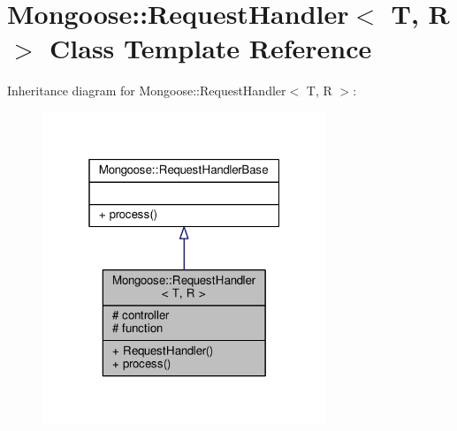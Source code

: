 \hypertarget{classMongoose_1_1RequestHandler}{}\section{Mongoose\+:\+:Request\+Handler$<$ T, R $>$ Class Template Reference}
\label{classMongoose_1_1RequestHandler}


Inheritance diagram for Mongoose\+:\+:Request\+Handler$<$ T, R $>$\+:
\nopagebreak
\begin{figure}[H]
\begin{center}
\leavevmode
\includegraphics[width=241pt]{d8/dcc/classMongoose_1_1RequestHandler__inherit__graph}
\end{center}
\end{figure}


